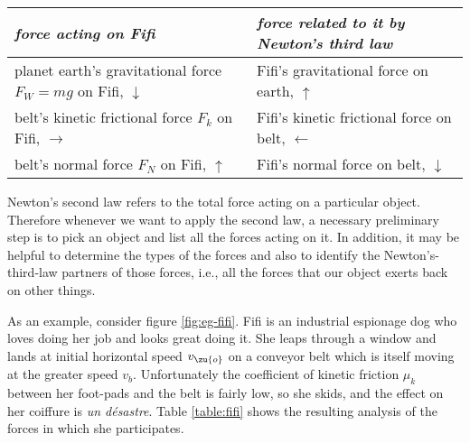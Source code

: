 \begin{timetravel}
\begin{table*}
\begin{tabular}{|p{52mm}|p{52mm}|}
\hline
\emph{force acting on Fifi}  &   \emph{force related to it by Newton's third law} \\
\hline
planet earth's gravitational force $F_W=mg$ on Fifi, \hfill $\downarrow$  &  Fifi's gravitational force on earth, \hfill $\uparrow$\\
\hline
belt's kinetic frictional force $F_k$ on Fifi, \hfill $\rightarrow$  &  Fifi's kinetic frictional force on belt, \hfill $\leftarrow$\\
\hline
belt's normal force $F_N$ on Fifi, \hfill $\uparrow$  &  Fifi's normal force on belt, \hfill $\downarrow$\\
\hline
\end{tabular}
\caption{Analysis of the forces on the dog shown in figure \ref{fig:eg-fifi}.}\label{table:fifi}
\end{table*}
\end{timetravel}

Newton's second law refers to the total force acting on a particular object.
Therefore whenever we want to apply the second law, a necessary preliminary
step is to pick an object and list all the forces acting on it. In addition,
it may be helpful to determine the types of the forces
and also to identify the Newton's-third-law partners of those forces,
i.e., all the forces that our object exerts back on other things.


As an example, consider figure \ref{fig:eg-fifi}. 
Fifi is an industrial espionage dog who loves doing her job and looks great doing it.
She leaps through a window and lands at initial horizontal speed $v_\zu{o}$ on a conveyor belt which is itself
moving at the greater speed $v_b$. Unfortunately the coefficient of kinetic friction $\mu_k$ between her foot-pads
and the belt is fairly low, so she skids, and the effect on her coiffure is \emph{un d\'{e}sastre}.
Table \ref{table:fifi} shows the resulting analysis of the forces in which she participates.
